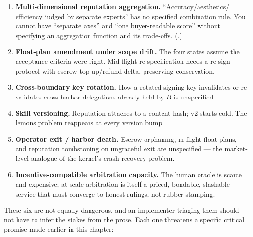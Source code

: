 \documentclass[11pt,a4paper]{article}
\theoremstyle{definition}
\theoremstyle{definition}
\theoremstyle{remark}
\begin{document}
\begin{enumerate}[leftmargin=1.6em,itemsep=3pt]
  \item \textbf{Multi-dimensional reputation aggregation.} ``Accuracy/aesthetics/
    efficiency judged by separate experts'' has no specified combination rule.
    You cannot have ``separate axes'' and ``one buyer-readable score'' without
    specifying an aggregation function and its trade-offs. (\Vision{}.)
  \item \textbf{Float-plan amendment under scope drift.} The four states assume the
    acceptance criteria were right. Mid-flight re-specification needs a re-sign
    protocol with escrow top-up/refund delta, preserving conservation.
  \item \textbf{Cross-boundary key rotation.} How a rotated signing key
    invalidates or re-validates cross-harbor delegations already held by $B$ is
    unspecified.
  \item \textbf{Skill versioning.} Reputation attaches to a content hash; v2 starts
    cold. The lemons problem reappears at every version bump.
  \item \textbf{Operator exit / harbor death.} Escrow orphaning, in-flight float
    plans, and reputation tombstoning on ungraceful exit are unspecified --- the
    market-level analogue of the kernel's crash-recovery problem.
  \item \textbf{Incentive-compatible arbitration capacity.} The human oracle is
    scarce and expensive; at scale arbitration is itself a priced, bondable,
    slashable service that must converge to honest rulings, not rubber-stamping.
\end{enumerate}

\noindent These six are not equally dangerous, and an implementer triaging them
should not have to infer the stakes from the prose. Each one threatens a specific
critical promise made earlier in this chapter:
\end{document}
